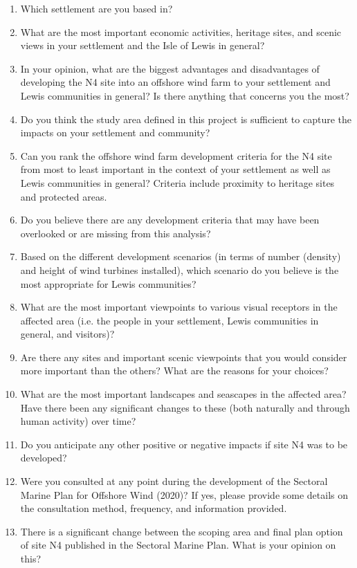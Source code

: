 \begin{enumerate}[noitemsep]
  \item Which settlement are you based in?
  \item What are the most important economic activities, heritage sites, and scenic views in your settlement and the Isle of Lewis in general?
  \item In your opinion, what are the biggest advantages and disadvantages of developing the N4 site into an offshore wind farm to your settlement and Lewis communities in general? Is there anything that concerns you the most?
  \item Do you think the study area defined in this project is sufficient to capture the impacts on your settlement and community?
  \item Can you rank the offshore wind farm development criteria for the N4 site from most to least important in the context of your settlement as well as Lewis communities in general? Criteria include proximity to heritage sites and protected areas.
  \item Do you believe there are any development criteria that may have been overlooked or are missing from this analysis?
  \item Based on the different development scenarios (in terms of number (density) and height of wind turbines installed), which scenario do you believe is the most appropriate for Lewis communities?
  \item What are the most important viewpoints to various visual receptors in the affected area (i.e. the people in your settlement, Lewis communities in general, and visitors)?
  \item Are there any sites and important scenic viewpoints that you would consider more important than the others? What are the reasons for your choices?
  \item What are the most important landscapes and seascapes in the affected area? Have there been any significant changes to these (both naturally and through human activity) over time?
  \item Do you anticipate any other positive or negative impacts if site N4 was to be developed?
  \item Were you consulted at any point during the development of the Sectoral Marine Plan for Offshore Wind (2020)? If yes, please provide some details on the consultation method, frequency, and information provided.
  \item There is a significant change between the scoping area and final plan option of site N4 published in the Sectoral Marine Plan. What is your opinion on this?

\end{enumerate}

